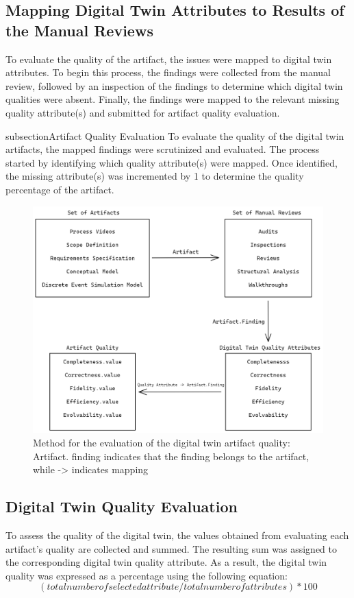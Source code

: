 \documentclass{llncs}
\begin{document}
    \subsection{Mapping Digital Twin Attributes to Results of the Manual Reviews}
    To evaluate the quality of the artifact, the issues were mapped to digital twin attributes. 
    To begin this process, the findings were collected from the manual review, followed by an inspection of the findings to determine which digital twin qualities were absent. 
    Finally, the findings were mapped to the relevant missing quality attribute(s) and submitted for artifact quality evaluation. 
    
    subsection{Artifact Quality Evaluation}
    To evaluate the quality of the digital twin artifacts, the mapped findings were scrutinized and evaluated. 
    The process started by identifying which quality attribute(s) were mapped. 
    Once identified, the missing attribute(s) was incremented by 1 to determine the quality percentage of the artifact. 
    
    \begin{figure}[htbp]
        \includegraphics[scale = 0.35]{RequirementSpecifications.png}
        \caption{Method for the evaluation of the digital twin artifact quality: Artifact. finding indicates that the finding belongs to the artifact, while -> indicates mapping}
        \label{fig:Method}
    \end{figure}
    
    \subsection{Digital Twin Quality Evaluation}
    To assess the quality of the digital twin, the values obtained from evaluating each artifact's quality are collected and summed. 
    The resulting sum was assigned to the corresponding digital twin quality attribute. 
    As a result, the digital twin quality was expressed as a percentage using the following equation:    
    \begin{equation}
        (totalnumberofselectedattribute/totalnumberofattributes)*100
    \end{equation}
\end{document}
